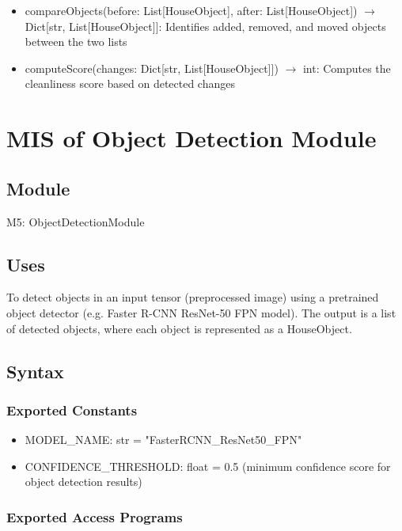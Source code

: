 \documentclass[12pt, titlepage]{article}
\begin{document}
\begin{itemize}
  \item compareObjects(before: List[HouseObject], after: List[HouseObject]) $\rightarrow$ Dict[str, List[HouseObject]]: Identifies added, removed, and moved objects between the two lists
  \item computeScore(changes: Dict[str, List[HouseObject]]) $\rightarrow$ int: Computes the cleanliness score based on detected changes
\end{itemize}

\newpage

\section{MIS of Object Detection Module} \label{Module} 

\subsection{Module}

M5: ObjectDetectionModule

\subsection{Uses}
To detect objects in an input tensor (preprocessed image) using a pretrained object detector (e.g. Faster R-CNN ResNet-50 FPN model). The output is a list of detected objects, where each object is represented as a HouseObject.

\subsection{Syntax}

\subsubsection{Exported Constants}

\begin{itemize}
  \item MODEL{\_}NAME: str = "FasterRCNN{\_}ResNet50{\_}FPN"
  \item CONFIDENCE{\_}THRESHOLD: float = 0.5 (minimum confidence score for object detection results)
\end{itemize}

\subsubsection{Exported Access Programs}
\end{document}
